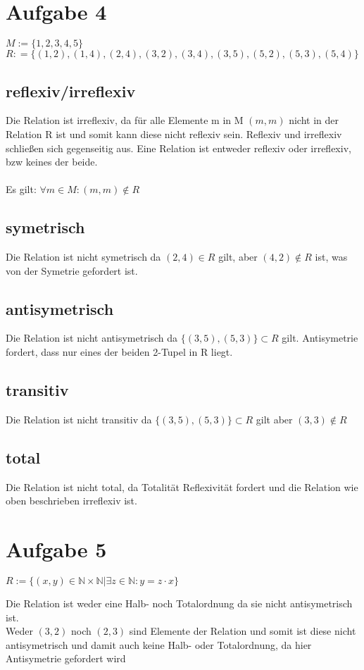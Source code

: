 \documentclass[18pt,a4paper]{article}
\begin{document}
	\section*{Aufgabe 4}
	\begin{center}
	$M:= \{1,2,3,4,5\}$\newline
	$R: = \{(1,2),(1,4),(2,4),(3,2),(3,4),(3,5),(5,2),(5,3),(5,4) \}$
	\end{center}
	\subsection*{reflexiv/irreflexiv}
	Die Relation ist irreflexiv, da f\"ur alle Elemente m in M $(m,m)$ nicht in der Relation R ist und somit kann diese nicht reflexiv sein. Reflexiv und irreflexiv schlie{\ss}en sich gegenseitig aus. Eine Relation ist entweder reflexiv oder irreflexiv, bzw keines der beide.\\
	\\
	Es gilt: $\forall m \in M : (m,m) \notin R $
	\subsection*{symetrisch}
	Die Relation ist nicht symetrisch da $(2,4) \in R $ gilt, aber $(4,2) \notin R$ ist, was von der Symetrie gefordert ist.\\
	\subsection*{antisymetrisch}
	Die Relation ist nicht antisymetrisch da $\{(3,5),(5,3)\} \subset R$ gilt. Antisymetrie fordert, dass nur eines der beiden 2-Tupel in R liegt.\\
	\subsection*{transitiv}
	Die Relation ist nicht transitiv da $\{(3,5),(5,3)\} \subset R$ gilt aber $(3,3) \notin R$\\
	\subsection*{total}
	Die Relation ist nicht total, da Totalit\"at Reflexivit\"at fordert und die Relation wie oben beschrieben irreflexiv ist.
	
	\section*{Aufgabe 5}
	\begin{center}
		$R:=\{(x,y) \in \mathbb{N}\times\mathbb{N}\vert \exists z \in \mathbb{N}: y=z\cdot x \}$
	\end{center}
	Die Relation ist weder eine Halb- noch Totalordnung da sie nicht antisymetrisch ist.\\
	Weder $(3,2)$ noch $(2,3)$ sind Elemente der Relation und somit ist diese nicht antisymetrisch und damit auch keine Halb- oder Totalordnung, da hier Antisymetrie gefordert wird
		
\end{document}
